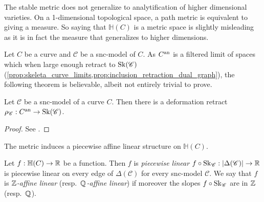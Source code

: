 \begin{remark}
	The stable metric does not generalize to analytification of higher dimensional varieties. 
	On a 1-dimensional topological space, a path metric is equivalent to giving a measure. 
	So saying that $\mathbb{H}(C)$ is a metric space is slightly misleading as it is in fact the measure that generalizes to higher dimensions. 
\end{remark}

Let $C$ be a curve and $\mathscr C$ be a snc-model of $C$. 
As $C{}^{\text{an}}$ is a filtered limit of spaces which when large enough retract to $\operatorname{Sk}(\mathscr C)$ (\cref{prop:skeleta_curve_limits,prop:inclusion_retraction_dual_graph}), the following theorem is believable, albeit not entirely trivial to prove. 
\begin{proposition}\label{prop:retract_analytification_skeleton}
	Let $\mathscr C$ be a snc-model of a curve $C$. 
	Then there is a deformation retract $\rho_{\mathscr C}: C{}^{\text{an}} \to \operatorname{Sk}(\mathscr C)$. 
\end{proposition}
\begin{proof}
	See \cite[§2.2.2]{bakerWeightFunctionsBerkovich2016}.
\end{proof}

The metric induces a piecewise affine linear structure on $\mathbb{H}(C)$. 
\begin{definition}
	Let $f: \mathbb{H}(C) \to \mathbb{R}$ be a function. 
	Then $f$ is \emph{piecewise linear} $f \circ \operatorname{Sk}_{\mathscr C}: |\Delta(\mathscr C)| \to \mathbb{R}$ is piecewise linear on every edge of $ \Delta(\mathscr C)$ for every snc-model $\mathscr C$. 
	We say that $f$ is \emph{$\mathbb{Z}$-affine linear} (resp.\ \emph{$\mathbb{Q}$-affine linear}) if moreover the slopes $f \circ \operatorname{Sk} _{\mathscr C}$ are in $\mathbb{Z} $ (resp.\ $\mathbb{Q}$).
\end{definition}



